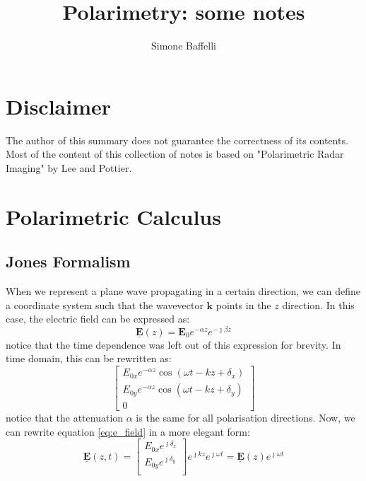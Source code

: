 \documentclass[11pt]{article}
\title{\textbf{Polarimetry: some notes}}
\author{Simone Baffelli}
\date{}
\begin{document}
\maketitle

\section{Disclaimer}
The author of this summary does not guarantee the correctness of its contents.
Most of the content of this collection of notes is based on "Polarimetric Radar Imaging" by Lee and Pottier\cite{Lee2009}. 
\section{Polarimetric Calculus}
\subsection{Jones Formalism}
When we represent a plane wave propagating in a certain direction, we can define a coordinate system such that the wavevector $\mathbf{k}$ points in the $z$ direction. In this case, the electric field can be expressed as:
\begin{equation}
	\mathbf{\underline{E}}\left(z\right) = \mathbf{E}_{0} e^{-\alpha z}e^{-\jmath \beta z}
\end{equation}
notice that the time dependence was left out of this expression for brevity.
In time domain, this can be rewritten as:
\begin{equation}
	\label{eq:e_field}
	\begin{bmatrix}
		E_{0x} e^{-\alpha z}\cos{\left(\omega t -  kz + \delta_{x}\right)} \\
		E_{0y} e^{-\alpha z}\cos{\left(\omega t -  kz + \delta_{y}\right)}\\
		0
	\end{bmatrix}
\end{equation}
notice that the attenuation $\alpha$ is the same for all polarisation directions.
Now, we can rewrite equation \ref{eq:e_field} in a more elegant form:
\begin{equation}
	\mathbf{\underline{E}}\left(z, t\right) = \begin{bmatrix}
		E_{0x} e^{\jmath\delta_{x}} \\
		E_{0y} e^{\jmath\delta_{y}} \\
	\end{bmatrix} e^{\jmath k z} e^{\jmath \omega t} = \mathbf{\underline{E}}\left(z\right) e^{\jmath \omega t}
\end{equation}
\end{document}
